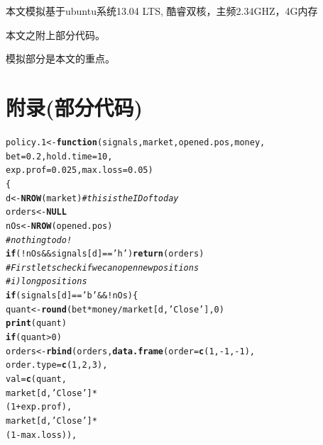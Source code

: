 \documentclass{article}\usepackage[]{graphicx}\usepackage[]{color}
\makeatletter
\newcommand{\hlnum}[1]{\textcolor[rgb]{0.686,0.059,0.569}{#1}}%
\newcommand{\hlstr}[1]{\textcolor[rgb]{0.192,0.494,0.8}{#1}}%
\newcommand{\hlcom}[1]{\textcolor[rgb]{0.678,0.584,0.686}{\textit{#1}}}%
\newcommand{\hlopt}[1]{\textcolor[rgb]{0,0,0}{#1}}%
\newcommand{\hlstd}[1]{\textcolor[rgb]{0.345,0.345,0.345}{#1}}%
\newcommand{\hlkwa}[1]{\textcolor[rgb]{0.161,0.373,0.58}{\textbf{#1}}}%
\newcommand{\hlkwb}[1]{\textcolor[rgb]{0.69,0.353,0.396}{#1}}%
\newcommand{\hlkwc}[1]{\textcolor[rgb]{0.333,0.667,0.333}{#1}}%
\newcommand{\hlkwd}[1]{\textcolor[rgb]{0.737,0.353,0.396}{\textbf{#1}}}%
\newenvironment{kframe}{%
 \def\at@end@of@kframe{}%
 \ifinner\ifhmode%
  \def\at@end@of@kframe{\end{minipage}}%
  \begin{minipage}{\columnwidth}%
 \fi\fi%
 \def\FrameCommand##1{\hskip\@totalleftmargin \hskip-\fboxsep
 \colorbox{shadecolor}{##1}\hskip-\fboxsep
     \hskip-\linewidth \hskip-\@totalleftmargin \hskip\columnwidth}%
 \MakeFramed {\advance\hsize-\width
   \@totalleftmargin\z@ \linewidth\hsize
   \@setminipage}}%
 {\par\unskip\endMakeFramed%
 \at@end@of@kframe}
\newenvironment{knitrout}{}{} %
\makeatother
\begin{document}
\begin{CJK*}{UTF8}{gkai}
\textbullet 本文模拟基于ubuntu系统13.04 LTS, 酷睿双核，主频2.34GHZ，4G内存

\textbullet 本文之附上部分代码。

\textbullet 模拟部分是本文的重点。
\section{附录(部分代码)}
\begin{knitrout}
\color{fgcolor}\begin{kframe}
\begin{alltt}
\hlstd{policy.1} \hlkwb{<-} \hlkwa{function}\hlstd{(}\hlkwc{signals}\hlstd{,} \hlkwc{market}\hlstd{,} \hlkwc{opened.pos}\hlstd{,} \hlkwc{money}\hlstd{,}
                     \hlkwc{bet} \hlstd{=} \hlnum{0.2}\hlstd{,} \hlkwc{hold.time} \hlstd{=} \hlnum{10}\hlstd{,}
                     \hlkwc{exp.prof} \hlstd{=} \hlnum{0.025}\hlstd{,} \hlkwc{max.loss} \hlstd{=} \hlnum{0.05}\hlstd{)}
\hlstd{\{}
  \hlstd{d} \hlkwb{<-} \hlkwd{NROW}\hlstd{(market)} \hlcom{# this is the ID of today}
  \hlstd{orders} \hlkwb{<-} \hlkwa{NULL}
  \hlstd{nOs} \hlkwb{<-} \hlkwd{NROW}\hlstd{(opened.pos)}
  \hlcom{#nothing to do!}
  \hlkwa{if}\hlstd{(}\hlopt{!}\hlstd{nOs} \hlopt{&&} \hlstd{signals[d]} \hlopt{==} \hlstr{'h'}\hlstd{)} \hlkwd{return} \hlstd{(orders)}
  \hlcom{#First lets check if we can open new positions}
  \hlcom{#i)long positions}
  \hlkwa{if}\hlstd{(signals[d]} \hlopt{==} \hlstr{'b'} \hlopt{&& !}\hlstd{nOs)\{}
    \hlstd{quant} \hlkwb{<-} \hlkwd{round}\hlstd{(bet}\hlopt{*}\hlstd{money}\hlopt{/}\hlstd{market[d,} \hlstr{'Close'}\hlstd{],} \hlnum{0}\hlstd{)}
    \hlkwd{print}\hlstd{(quant)}
    \hlkwa{if}\hlstd{(quant} \hlopt{>} \hlnum{0}\hlstd{)}
      \hlstd{orders} \hlkwb{<-} \hlkwd{rbind}\hlstd{(orders,} \hlkwd{data.frame}\hlstd{(}\hlkwc{order} \hlstd{=} \hlkwd{c}\hlstd{(}\hlnum{1}\hlstd{,} \hlopt{-}\hlnum{1}\hlstd{,} \hlopt{-}\hlnum{1}\hlstd{),}
                                         \hlkwc{order.type} \hlstd{=} \hlkwd{c}\hlstd{(}\hlnum{1}\hlstd{,} \hlnum{2}\hlstd{,} \hlnum{3}\hlstd{),}
                                         \hlkwc{val} \hlstd{=} \hlkwd{c}\hlstd{(quant,}
                                                 \hlstd{market[d,} \hlstr{'Close'}\hlstd{]}\hlopt{*}
                                                   \hlstd{(}\hlnum{1}\hlopt{+}\hlstd{exp.prof),}
                                                 \hlstd{market[d,} \hlstr{'Close'}\hlstd{]}\hlopt{*}
                                                   \hlstd{(}\hlnum{1} \hlopt{-} \hlstd{max.loss)),}

\end{alltt}
\end{kframe}
\end{knitrout}
\end{CJK*}
\end{document}
